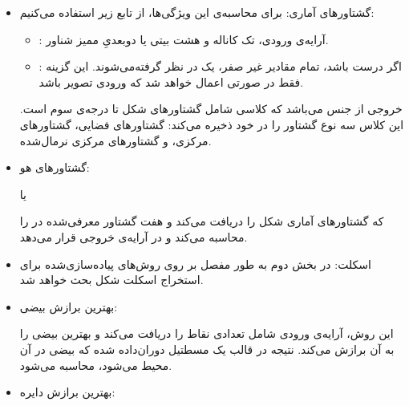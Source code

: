 \documentclass[12pt,a4paper]{article}
\theoremstyle{definition}
\theoremstyle{theorem}
\theoremstyle{definition}
\begin{document}
\begin{itemize}
\item
گشتاورهای آماری: 
برای محاسبه‌ی این ویژگی‌ها، از تابع زیر استفاده می‌کنیم:

\begin{flushleft}
\end{flushleft}


\begin{itemize}
\renewcommand{\labelitemii}{$\circ$}
\item
{} : 
آرایه‌ی ورودی، تک کاناله و هشت بیتی یا دوبعدیِ ممیز شناور. 

\item
{} : 
اگر درست باشد، تمام مقادیر غیر صفر، یک در نظر گرفته‌می‌شوند. این گزینه فقط در صورتی اعمال خواهد شد که ورودی تصویر باشد. 
\end{itemize}
خروجی از جنس  می‌باشد که کلاسی شامل گشتاورهای شکل تا درجه‌ی سوم است. این کلاس سه نوع گشتاور را در خود ذخیره می‌کند: گشتاورهای فضایی، گشتاورهای مرکزی، و گشتاورهای مرکزی نرمال‌شده. 

\item
گشتاورهای هو\cite{Hu}: 

\begin{flushleft}
\end{flushleft}
یا

\begin{flushleft}
\end{flushleft}

که گشتاورهای آماری شکل را دریافت می‌کند و هفت گشتاور معرفی‌شده در \cite{Hu} را محاسبه می‌کند و در آرایه‌ی خروجی  قرار می‌دهد.

\item
اسکلت:‌ در بخش دوم به طور مفصل بر روی روش‌های پیاده‌سازی‌شده برای استخراج اسکلت شکل بحث خواهد شد.

\item
بهترین برازش بیضی: 
\begin{flushleft}
\end{flushleft}
این روش، آرایه‌ی ورودی شامل تعدادی نقاط را دریافت می‌کند و بهترین بیضی را به آن برازش می‌کند. نتیجه در قالب یک مسطتیل دوران‌‌داده شده که بیضی در آن محیط می‌شود، محاسبه می‌شود. 



\item
بهترین برازش دایره: 


\end{itemize}
\end{document}
